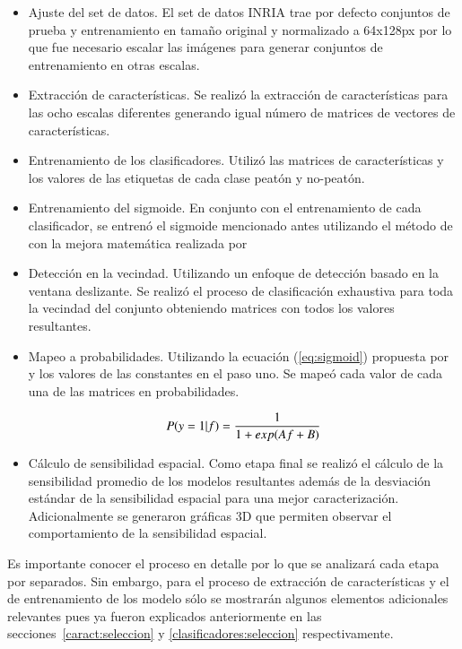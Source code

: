 \begin{itemize}
\item Ajuste del set de datos. El set de datos INRIA trae por defecto conjuntos de prueba y entrenamiento en tamaño original y normalizado a 64x128px por lo que fue necesario escalar las imágenes para generar conjuntos de entrenamiento en otras escalas.
\item Extracción de características. Se realizó la extracción de características para las ocho escalas diferentes generando igual número de matrices de vectores de características.
\item Entrenamiento de los clasificadores. Utilizó las matrices de características y los valores de las etiquetas de cada clase peatón y no-peatón.
\item Entrenamiento del sigmoide. En conjunto con el entrenamiento de cada clasificador, se entrenó el sigmoide mencionado antes utilizando el método de \cite{Platt1999} con la mejora matemática realizada por \cite{Lin2000}
\item Detección en la vecindad. Utilizando un enfoque de detección basado en la ventana deslizante. Se realizó el proceso de clasificación exhaustiva para toda la vecindad del conjunto obteniendo matrices con todos los valores resultantes.
\item Mapeo a probabilidades. Utilizando la ecuación (\ref{eq:sigmoid}) propuesta por \cite{Platt1999} y los valores de las constantes en el paso uno. Se mapeó cada valor de cada una de las matrices en probabilidades.
    
\begin{equation}
\centering
\label{eq:sigmoid}
P(y=1|f)=\frac{1}{1+exp(Af+B)}
\end{equation}

\item Cálculo de sensibilidad espacial. Como etapa final se realizó el cálculo de la sensibilidad promedio de los modelos resultantes además de la desviación estándar de la sensibilidad espacial para una mejor caracterización. Adicionalmente se generaron gráficas 3D que permiten observar el comportamiento de la sensibilidad espacial.
\end{itemize}

Es importante conocer el proceso en detalle por lo que se analizará cada etapa por separados. Sin embargo, para el proceso de extracción de características y el de entrenamiento de los modelo sólo se mostrarán algunos elementos adicionales relevantes pues ya fueron explicados anteriormente en las secciones~\ref{caract:seleccion} y \ref{clasificadores:seleccion} respectivamente.

